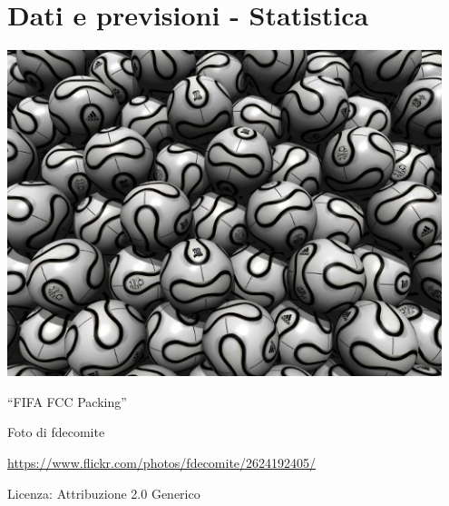 \part{Dati e previsioni - Statistica}

\includegraphics[width=0.95\textwidth]{img/fifafcc.jpg}
  \begin{center}
    {\large ``FIFA FCC Packing''}\par
    Foto di fdecomite\par
    \url{https://www.flickr.com/photos/fdecomite/2624192405/}\par
    Licenza: Attribuzione 2.0 Generico\par
  \end{center}
\clearpage
\cleardoublepage
